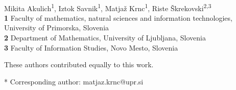 \documentclass[10pt,letterpaper]{article}
\providecommand{\DIFaddtex}[1]{{\protect\color{blue}\uwave{#1}}} %
\providecommand{\DIFaddbegin}{} %
\providecommand{\DIFaddend}{} %
\providecommand{\DIFadd}[1]{\texorpdfstring{\DIFaddtex{#1}}{#1}} %
\newcommand{\DIFaddincludegraphics}[2][]{{\color{blue}\fbox{\DIFOincludegraphics[#1]{#2}}}} %
\DeclareRobustCommand{\DIFaddbegin}{\DIFOaddbegin \let\includegraphics\DIFaddincludegraphics} %
\DeclareRobustCommand{\DIFaddend}{\DIFOaddend \let\includegraphics\DIFOincludegraphics} %
\begin{document}
\vspace*{0.2in}

\begin{flushleft}
{\Large
\textbf{} %
}
\newline
\\
Mikita Akulich\textsuperscript{1\Yinyang},
Iztok Savnik\textsuperscript{1\Yinyang},
Matjaž Krnc\textsuperscript{1\Yinyang*},
Riste Škrekovski\textsuperscript{\DIFaddbegin \DIFadd{1,}\DIFaddend 2,3\Yinyang}
\\
\bigskip
\textbf{1} Faculty of mathematics, natural sciences and information technologies, \\University of Primorska, Slovenia
\\
\textbf{2} Department of Mathematics, University of Ljubljana, Slovenia
\\
\textbf{3} Faculty of Information Studies, Novo Mesto, Slovenia
\\
\bigskip

% 
%
\Yinyang These authors contributed equally to this work.





* Corresponding author: matjaz.krnc@upr.si

\end{flushleft}
\end{document}
